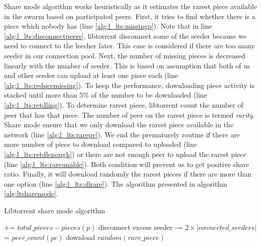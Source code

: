 Share mode algorithm works heuristically as it estimates the rarest piece available in the swarm based on participated peers. First, it tries to find whether there is a piece which nobody has (line \ref{alg:l_lts:missingp}). Note that in line \ref{alg:l_lts:disconnectpeers}, libtorrent disconnect some of the seeder because we need to connect to the leecher later. This case is considered if there are too many seeder in our connection pool. Next, the number of missing pieces is decreased linearly with the number of seeder. This is based on assumption that both of us and other seeder can upload at least one piece each (line \ref{alg:l_lts:reducemissing}). To keep the performance, downloading piece activity is stacked until more than 5\% of the number to be downloaded (line \ref{alg:l_lts:retdling}). To determine rarest piece, libtorrent count the number of peer that has that piece. The number of peer on the rarest piece is termed \textit{rarity}. Share mode ensure that we only download the rarest piece available in the network (line \ref{alg:l_lts:rarepc}). We end the prematurely routine if there are more number of piece to download compared to uploaded (line \ref{alg:l_lts:retdlenough}) or there are not enough peer to upload the rarest piece (line \ref{alg:l_lts:rareunable}). Both condition will prevent us to get positive share ratio. Finally, it will download randomly the rarest pieces if there are more than one option (line \ref{alg:l_lts:dlrare}). The algorithm presented in algorithm \ref{alg:ltsharemode}. 

\begin{algorithm}[]
	\caption{Libtorrent share mode algorithm}
	\label{alg:ltsharemode}
	\begin{algorithmic}[1]
		\Statex
		 += {$total\_pieces - pieces(p)$} \label{alg:l_lts:missingp}
		\EndIf	
		\EndFor
		\State disconnect excess seeder \label{alg:l_lts:disconnectpeers}
		\EndIf
		 -= {$2 \times |connected\_seeders|$}	\label{alg:l_lts:reducemissing}	
		\State \Return
		\EndIf
		 \label{alg:l_lts:retdlenough}
		\State \Return
		\EndIf
		 \label{alg:l_lts:retdling}
		\State \Return
		\EndIf
			\label{alg:l_lts:rarepc}
		 = {$peer\_count(pc)$} 
		\EndIf	
		\EndFor
		 \label{alg:l_lts:rareunable}
		\State \Return
		\EndIf
		\State download {$random(rare\_piece)$} \label{alg:l_lts:dlrare}
	\end{algorithmic}
\end{algorithm}

